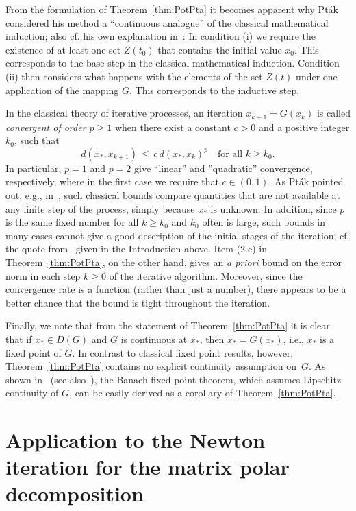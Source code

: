 \documentclass{siamltex}
\begin{document}
\medskip
From the formulation of Theorem~\ref{thm:PotPta} it becomes apparent why Pt\'ak
considered his method a ``continuous analogue'' of the classical mathematical induction;
also cf. his own explanation in~\cite[p.~225--226]{Pta76b}: In condition (i) we require
the existence of at least one set $Z(t_0)$ that contains the initial value $x_0$.
This corresponds to the base step in the classical mathematical induction.
Condition (ii) then considers what happens with the elements of the set $Z(t)$
under one application of the mapping $G$. This corresponds to the inductive step.

In the classical theory of iterative processes, an iteration $x_{k+1}=G(x_k)$
is called {\em convergent of order $p\geq 1$} when there exist a constant $c>0$ and a
positive integer $k_0$, such that
\begin{equation}\label{eqn:classical}
d(x_*,x_{k+1})\,\leq\, c\, d(x_*,x_{k})^p\quad\mbox{for all $k\geq k_0$.}
\end{equation}
In particular, $p=1$ and $p=2$ give ``linear'' and ''quadratic'' convergence,
respectively, where in the first case we require that $c\in (0,1)$.
As Pt\'ak pointed out, e.g., in~\cite{Pta77,Pta89}, such classical bounds compare quantities that
are not available at any finite step of the process, simply because $x_*$ is unknown. In addition,
since $p$ is the same fixed number for all $k\geq k_0$ and $k_0$ often is large, such
bounds in many cases cannot give a good description of the initial stages of the iteration;
cf. the quote from~\cite{Pta77} given in the Introduction above.
Item (2.c) in Theorem~\ref{thm:PotPta}, on the other hand, gives an {\em a priori} bound
on the error norm in each step $k\geq 0$ of the iterative algorithm. Moreover, since the
convergence rate is a function (rather than just a number), there appears to be a better chance
that the bound is tight throughout the iteration.

Finally, we note that from the statement of Theorem~\ref{thm:PotPta} it is clear
that if $x_*\in D(G)$ and $G$ is continuous at $x_*$, then $x_*=G(x_*)$,
i.e., $x_*$ is a fixed point of $G$. In contrast to classical fixed point
results, however, Theorem~\ref{thm:PotPta} contains no explicit continuity assumption on~$G$.
As shown in~\cite[pp.~10--12]{PotPtaBook84} (see also~\cite[Section~3]{Pta76b}), 
the Banach fixed point theorem, which assumes Lipschitz continuity of $G$, can be easily derived
as a corollary of Theorem~\ref{thm:PotPta}.

\section{Application to the Newton iteration for the matrix polar decomposition}\label{sec:polar}
\end{document}

